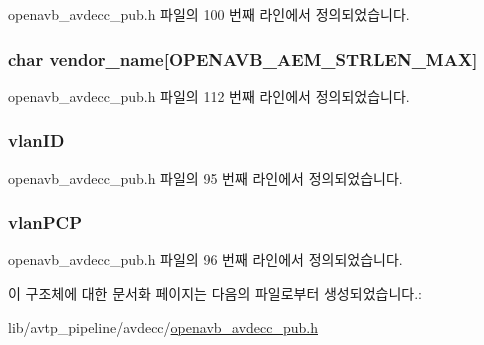 openavb\+\_\+avdecc\+\_\+pub.\+h 파일의 100 번째 라인에서 정의되었습니다.

\subsubsection[{\texorpdfstring{vendor\+\_\+name}{vendor_name}}]{\setlength{\rightskip}{0pt plus 5cm}char vendor\+\_\+name\mbox{[}{\bf O\+P\+E\+N\+A\+V\+B\+\_\+\+A\+E\+M\+\_\+\+S\+T\+R\+L\+E\+N\+\_\+\+M\+AX}\mbox{]}}\hypertarget{structopenavb__avdecc__cfg__t_a5fa2d0fc97f2492fae6c3d175cc4b0db}{}\label{structopenavb__avdecc__cfg__t_a5fa2d0fc97f2492fae6c3d175cc4b0db}


openavb\+\_\+avdecc\+\_\+pub.\+h 파일의 112 번째 라인에서 정의되었습니다.

\subsubsection[{\texorpdfstring{vlan\+ID}{vlanID}}]{ vlan\+ID}\hypertarget{structopenavb__avdecc__cfg__t_a6f9e150f3345cb797072070d8972aec8}{}\label{structopenavb__avdecc__cfg__t_a6f9e150f3345cb797072070d8972aec8}


openavb\+\_\+avdecc\+\_\+pub.\+h 파일의 95 번째 라인에서 정의되었습니다.

\subsubsection[{\texorpdfstring{vlan\+P\+CP}{vlanPCP}}]{ vlan\+P\+CP}\hypertarget{structopenavb__avdecc__cfg__t_aeceb46fe9886e43a65d96da0339c43fb}{}\label{structopenavb__avdecc__cfg__t_aeceb46fe9886e43a65d96da0339c43fb}


openavb\+\_\+avdecc\+\_\+pub.\+h 파일의 96 번째 라인에서 정의되었습니다.



이 구조체에 대한 문서화 페이지는 다음의 파일로부터 생성되었습니다.\+:\begin{DoxyCompactItemize}
\item 
lib/avtp\+\_\+pipeline/avdecc/\hyperlink{openavb__avdecc__pub_8h}{openavb\+\_\+avdecc\+\_\+pub.\+h}\end{DoxyCompactItemize}
